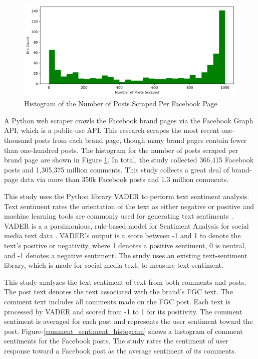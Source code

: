 \documentclass{article}
\begin{document}
\begin{figure}
    \includegraphics[width=\columnwidth]{images/Posts_Per_Page_Histogram.png}
    \caption{Histogram of the Number of Posts Scraped Per Facebook Page}
    \label{fig:histogram_posts_scraped}
\end{figure}

A Python web scraper crawls the Facebook brand pages via the Facebook Graph API, which is a public-use API. This research scrapes the most recent one-thousand posts from each brand page, though many brand pages contain fewer than one-hundred posts. The histogram for the number of posts scraped per brand page are shown in Figure \ref{fig:histogram_posts_scraped}. In total, the study collected 366,415 Facebook posts and 1,305,375 million comments. This study collects a great deal of brand-page data via more than 350k Facebook posts and 1.3 million comments.

This study uses the Python library VADER to perform text sentiment analysis. Text sentiment rates the orientation of the text as either negative or positive and machine learning tools are commonly used for generating text sentiments \cite{HADDI201326}.  VADER is a a parsimonious, rule-based model for Sentiment Analysis for social media text data \cite{Gilbert}. VADER's output is a score between -1 and 1 to denote the text's positive or negativity, where 1 denotes a positive sentiment, 0 is neutral, and -1 denotes a negative sentiment. The study uses an existing text-sentiment library, which is made for social media text, to measure text sentiment.

This study analyzes the text sentiment of text from both comments and posts. The post text denotes the text associated with the brand's FGC text. The comment text includes all comments made on the FGC post. Each text is processed by VADER and scored from -1 to 1 for its positivity. The comment sentiment is averaged for each post and represents the user sentiment toward the post. Figure-\ref{comment_sentiment_histogram} shows a histogram of comment sentiments for the Facebook posts. The study rates the sentiment of user response toward a Facebook post as the average sentiment of its comments.
\end{document}
